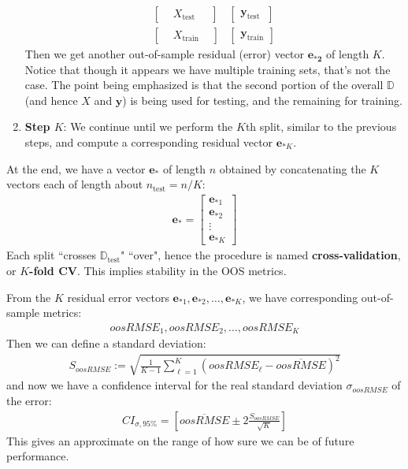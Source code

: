 \documentclass[12pt, a4paper]{article}
\theoremstyle{definition}
\begin{document}
\begin{enumerate}[label=(\alph*)]
\begin{align*}
			\begin{bmatrix}
				{} & X_{\text{test\ \ }} & {}
			\end{bmatrix}
			&
			\begin{bmatrix}
				\mathbf{y}_{\text{test\ \ }}
			\end{bmatrix}\\
			\begin{bmatrix}
				{} & X_{\text{train}} & {}
			\end{bmatrix}
			&
			\begin{bmatrix}
				\mathbf{y}_{\text{train}}
			\end{bmatrix}
		\end{align*}
		Then we get another out-of-sample residual (error) vector $\mathbf{e_{*2}}$
		of length $K$. Notice that though it appears we have multiple training sets, that's
		not the case. The point being emphasized is that the second portion of the
		overall $\mathbb{D}$ (and hence $X$ and $\mathbf{y}$) is being used for testing,
		and the remaining for training.
		\item \textbf{Step $K$}: We continue until we perform the $K$th split, similar to
		the previous steps, and compute a corresponding residual vector $\mathbf{e}_{*K}$.
	\end{enumerate}
	At the end, we have a vector $\mathbf{e}_*$ of length $n$ obtained by concatenating the
	$K$ vectors each of length about $n_{\text{test}} = n/K$:
	\begin{align*}
		\mathbf{e}_* = \begin{bmatrix}
			\mathbf{e}_{*1}\\
			\mathbf{e}_{*2}\\
			\vdots\\
			\mathbf{e}_{*K}
		\end{bmatrix}
	\end{align*}
	Each split ``crosses $\mathbb{D}_{\text{test}}$" ``over", hence the procedure is
	named \textbf{cross-validation}, or \textbf{$K$-fold CV}. This implies stability
	in the OOS metrics.
	
	From the $K$ residual error vectors $\mathbf{e}_{*1},\mathbf{e}_{*2},\ldots,\mathbf{e}_{*K}$,
	we have corresponding out-of-sample metrics:
	\begin{align*}
		oosRMSE_1,oosRMSE_2,\ldots,oosRMSE_K
	\end{align*}
	Then we can define a standard deviation:
	\begin{align*}
		S_{oosRMSE}:=\sqrt{\frac{1}{K-1}\sum_{\ell=1}^{K}
			\left(oosRMSE_{\ell} - \overline{oosRMSE}\right)^2}
	\end{align*}
	and now we have a confidence interval for the real standard deviation $\sigma_{oosRMSE}$
	of the error:
	\begin{align*}
		CI_{\sigma, 95\%}=\left[
		\overline{oosRMSE} \pm 2\frac{S_{oosRMSE}}{\sqrt{K}}
		\right]
	\end{align*}
	This gives an approximate on the range of how sure we can be of future performance.
	\pagebreak
	\printbibliography
\end{document}
